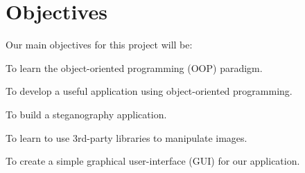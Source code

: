\section{Objectives}

Our main objectives for this project will be:

\begin{itemize*}
    \item{} To learn the object-oriented programming (OOP) paradigm.
    \item{} To develop a useful application using object-oriented programming.
    \item{} To build a steganography application.
    \item{} To learn to use 3rd-party libraries to manipulate images.
    \item{} To create a simple graphical user-interface (GUI) for our
        application.
\end{itemize*}
